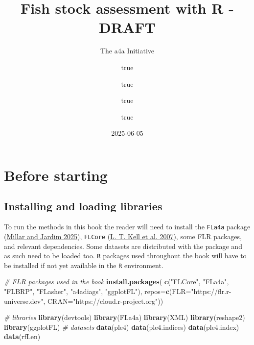 \documentclass[
]{book}
\title{Fish stock assessment with R - DRAFT}
\subtitle{The a4a Initiative}
\author{true \and true \and true \and true}
\date{2025-06-05}
\newenvironment{Shaded}{\begin{snugshade}}{\end{snugshade}}
\newcommand{\AttributeTok}[1]{\textcolor[rgb]{0.13,0.29,0.53}{#1}}
\newcommand{\CommentTok}[1]{\textcolor[rgb]{0.56,0.35,0.01}{\textit{#1}}}
\newcommand{\FunctionTok}[1]{\textcolor[rgb]{0.13,0.29,0.53}{\textbf{#1}}}
\newcommand{\NormalTok}[1]{#1}
\newcommand{\StringTok}[1]{\textcolor[rgb]{0.31,0.60,0.02}{#1}}
\begin{document}
\maketitle

{
\setcounter{tocdepth}{1}
\tableofcontents
}
\hypertarget{before-starting}{%
\chapter{Before starting}\label{before-starting}}

\hypertarget{installing-and-loading-libraries}{%
\section{Installing and loading libraries}\label{installing-and-loading-libraries}}

To run the methods in this book the reader will need to install the \texttt{FLa4a} package (\protect\hyperlink{ref-fla4a}{Millar and Jardim 2025}), \texttt{FLCore} (\protect\hyperlink{ref-flr}{L. T. Kell et al. 2007}), some FLR packages, and relevant dependencies. Some datasets are distributed with the package and as such need to be loaded too. \texttt{R} packages used throughout the book will have to be installed if not yet available in the \texttt{R} environment.

\begin{Shaded}
\begin{Highlighting}[]
\CommentTok{\# FLR packages used in the book}
\FunctionTok{install.packages}\NormalTok{(}
  \FunctionTok{c}\NormalTok{(}\StringTok{"FLCore"}\NormalTok{, }\StringTok{"FLa4a"}\NormalTok{, }\StringTok{"FLBRP"}\NormalTok{, }\StringTok{"FLasher"}\NormalTok{, }\StringTok{"a4adiags"}\NormalTok{, }\StringTok{"ggplotFL"}\NormalTok{),}
  \AttributeTok{repos=}\FunctionTok{c}\NormalTok{(}\AttributeTok{FLR=}\StringTok{"https://flr.r{-}universe.dev"}\NormalTok{, }\AttributeTok{CRAN=}\StringTok{"https://cloud.r{-}project.org"}\NormalTok{))}
\end{Highlighting}
\end{Shaded}

\begin{Shaded}
\begin{Highlighting}[]
\CommentTok{\# libraries}
\FunctionTok{library}\NormalTok{(devtools)}
\FunctionTok{library}\NormalTok{(FLa4a)}
\FunctionTok{library}\NormalTok{(XML)}
\FunctionTok{library}\NormalTok{(reshape2)}
\FunctionTok{library}\NormalTok{(ggplotFL)}
\CommentTok{\# datasets}
\FunctionTok{data}\NormalTok{(ple4)}
\FunctionTok{data}\NormalTok{(ple4.indices)}
\FunctionTok{data}\NormalTok{(ple4.index)}
\FunctionTok{data}\NormalTok{(rfLen)}
\end{Highlighting}
\end{Shaded}
\end{document}
